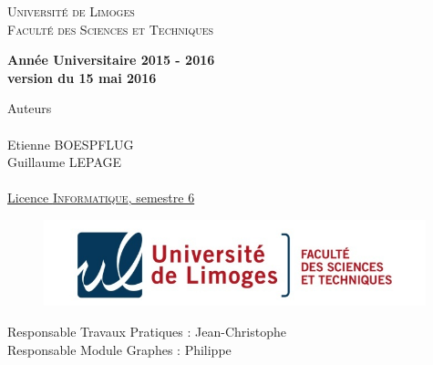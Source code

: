 \documentclass[12pt]{article}
\begin{document}
\begin{titlepage}
\setlength{\headheight}{0cm}
\setlength{\headsep}{0cm}
{

  \begin{center}
    { \small \textsc{Université de Limoges}\\
      \textsc{Faculté des Sciences et Techniques}\\
    }

    \vspace{2cm}

      \textbf {	Année Universitaire 2015 - 2016\\
      			version du 15 mai 2016}
    \vspace{2cm}  


    \vspace{15mm}

    Auteurs\\~\\
    {\large 
    \bsc Etienne BOESPFLUG\\
    	 Guillaume LEPAGE}\\
    ~\\
   \underline{Licence \textsc{Informatique}, semestre 6}\\ 

	\vspace{3cm}  

  \begin{figure}[!h]
	\centering
	\includegraphics[height=25mm]{imgs/unilim-fst.jpg}
  \end{figure}
  \end{center}
  
  \vfill
  \begin{flushleft}
	Responsable Travaux Pratiques : Jean-Christophe \\
	Responsable Module Graphes : Philippe \\
\end{flushleft}
  }
\end{titlepage}
\end{document}
